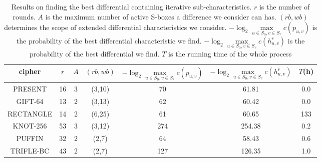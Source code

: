 \begin{table}
	\caption{Results on finding the best differential containing iterative sub-characteristics. $r$ is the number of rounds. $A$ is the maximum number of active S-boxes a difference we consider can has. $(rb,wb)$ determines the scope of extended differential characteristics we consider. $-\log_2\max\limits_{u\in S_0,v\in S_r}c(p_{u,v})$ is the probability of the best differential characteristic we find. $-\log_2\max\limits_{u\in S_0,v\in S_r}c(h^r_{u,v})$ is the probability of the best differential we find. $T$ is the running time of the whole process}\label{tab:EDP}
	\centering
	\begin{tabular}{|c|c|c|c|c|c|c|}
		\hline
		cipher & $r$ & $A$ & $(rb,wb)$ & $-\log_2\max\limits_{u\in S_0,v\in S_r}c(p_{u,v})$ & $-\log_2\max\limits_{u\in S_0,v\in S_r}c(h^r_{u,v})$ & $T$(h) \\
		\hline
		PRESENT & 16 & 3 & (3,10) & 70 & 61.81 & 0.0 \\
		\hline
		GIFT-64 & 13 & 2 & (3,13) & 62 & 60.42 & 0.0\\
		\hline 
		RECTANGLE & 14 & 2 & (6,25) & 61 & 60.65 & 133 \\
		\hline
		KNOT-256 & 53 & 3 & (3,12) & 274 & 254.38 & 0.2 \\
		\hline
		PUFFIN & 32 & 2 & (2,7) & 64 & 58.43 & 0.6 \\
		\hline
		TRIFLE-BC & 43 & 2 & (2,7) & 127 & 126.35 & 1.0 \\
		\hline
	\end{tabular}
\end{table}

